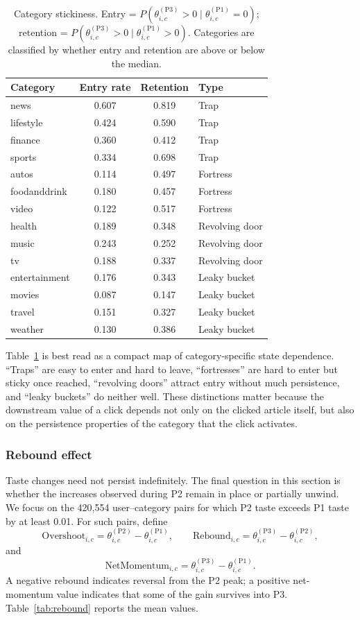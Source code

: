 \documentclass[11pt]{article}
\begin{document}
\begin{table}[ht]
\centering
\caption{Category stickiness. Entry = $P(\theta_{i,c}^{(\text{P3})} > 0 \mid \theta_{i,c}^{(\text{P1})} = 0)$; retention = $P(\theta_{i,c}^{(\text{P3})} > 0 \mid \theta_{i,c}^{(\text{P1})} > 0)$. Categories are classified by whether entry and retention are above or below the median.}
\label{tab:stickiness}
\begin{tabular}{lccl}
\toprule
Category & Entry rate & Retention & Type \\
\midrule
news & 0.607 & 0.819 & Trap \\
lifestyle & 0.424 & 0.590 & Trap \\
finance & 0.360 & 0.412 & Trap \\
sports & 0.334 & 0.698 & Trap \\
autos & 0.114 & 0.497 & Fortress \\
foodanddrink & 0.180 & 0.457 & Fortress \\
video & 0.122 & 0.517 & Fortress \\
health & 0.189 & 0.348 & Revolving door \\
music & 0.243 & 0.252 & Revolving door \\
tv & 0.188 & 0.337 & Revolving door \\
entertainment & 0.176 & 0.343 & Leaky bucket \\
movies & 0.087 & 0.147 & Leaky bucket \\
travel & 0.151 & 0.327 & Leaky bucket \\
weather & 0.130 & 0.386 & Leaky bucket \\
\bottomrule
\end{tabular}
\end{table}
\FloatBarrier

Table~\ref{tab:stickiness} is best read as a compact map of category-specific state dependence. ``Traps'' are easy to enter and hard to leave, ``fortresses'' are hard to enter but sticky once reached, ``revolving doors'' attract entry without much persistence, and ``leaky buckets'' do neither well. These distinctions matter because the downstream value of a click depends not only on the clicked article itself, but also on the persistence properties of the category that the click activates.

\subsubsection{Rebound effect}

Taste changes need not persist indefinitely. The final question in this section is whether the increases observed during P2 remain in place or partially unwind. We focus on the 420,554 user--category pairs for which P2 taste exceeds P1 taste by at least 0.01. For such pairs, define
\[
\text{Overshoot}_{i,c}
=
\theta_{i,c}^{(\mathrm{P2})}
-
\theta_{i,c}^{(\mathrm{P1})},
\qquad
\text{Rebound}_{i,c}
=
\theta_{i,c}^{(\mathrm{P3})}
-
\theta_{i,c}^{(\mathrm{P2})},
\]
and
\[
\text{NetMomentum}_{i,c}
=
\theta_{i,c}^{(\mathrm{P3})}
-
\theta_{i,c}^{(\mathrm{P1})}.
\]
A negative rebound indicates reversal from the P2 peak; a positive net-momentum value indicates that some of the gain survives into P3. Table~\ref{tab:rebound} reports the mean values.
\end{document}
